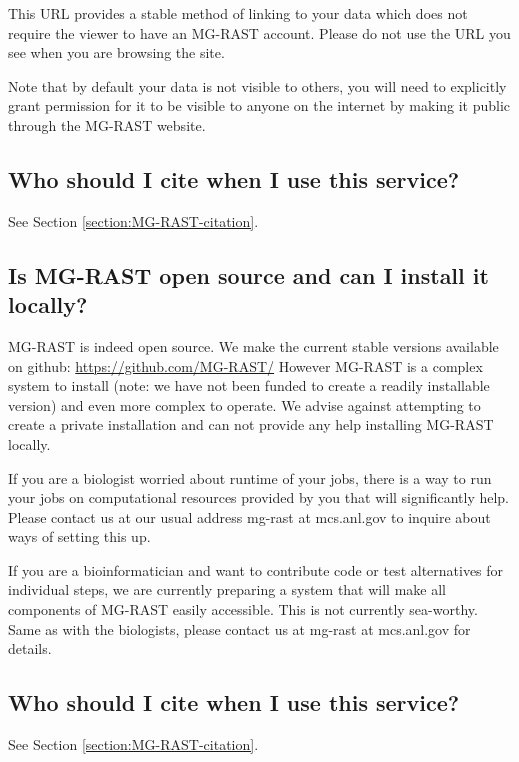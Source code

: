 \documentclass[12pt,fullpage]{report}
\begin{document}
\noindent
This URL provides a stable method of linking to your data which does not require the viewer to have an MG-RAST account. Please do not use the URL you see when you are browsing the site.

\noindent
Note that by default your data is not visible to others, you will need to explicitly grant permission for it to be visible to anyone on the internet by making it public through the MG-RAST website.
\subsection{Who should I cite when I use this service?}
See Section \ref{section:MG-RAST-citation}.
\subsection{Is MG-RAST open source and can I install it locally?}
MG-RAST is indeed open source. We make the current stable versions available on github: \url{https://github.com/MG-RAST/}
However MG-RAST is a complex system to install (note: we have not been funded to create a readily installable version) and even more complex to operate. We advise against attempting to create a private installation and can not provide any help installing MG-RAST locally.

If you are a biologist worried about runtime of your jobs, there is a way to run your jobs on computational resources provided by you that will significantly help. Please contact us at our usual address mg-rast at mcs.anl.gov to inquire about ways of setting this up.

If you are a bioinformatician and want to contribute code or test alternatives for individual steps, we are currently preparing a system that will make all components of MG-RAST easily accessible. This is not currently sea-worthy. Same as with the biologists, please contact us at mg-rast at mcs.anl.gov for details.
\subsection{Who should I cite when I use this service?}
See Section \ref{section:MG-RAST-citation}.
\end{document}
